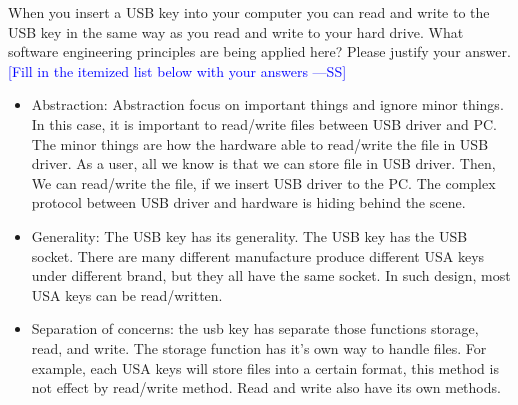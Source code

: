 \documentclass[12pt,fleqn]{examtst}
\newcommand{\authornote}[3]{\textcolor{#1}{[#3 ---#2]}}
\newcommand{\authornote}[3]{}
\newcommand{\wss}[1]{\authornote{blue}{SS}{#1}}
\begin{document}

\newpage

 When you insert a USB key into your computer you can read and
write to the USB key in the same way as you read and write to your hard drive.  What
software engineering principles are being applied here?  Please justify your
answer.\\

\noindent \wss{Fill in the itemized list below with your answers}

\begin{itemize}
\item Abstraction: Abstraction focus on important things and ignore minor things. In this case, it is important to read/write 
files between USB driver and PC. The minor things are how the hardware able to read/write the file in USB driver. As a user, 
all we know is that we can store file in USB driver. Then, We can read/write the file, if we insert USB driver to the PC. The 
complex protocol between USB driver and hardware is hiding behind the scene.
\item Generality: The USB key has its generality. The USB key has the USB socket. There are many different manufacture produce 
different USA keys under different brand, but they all have the same socket. In such design, most USA keys can be read/written.
\item Separation of concerns: the usb key has separate those functions storage, read, and write. The storage function has it's 
own way to handle files. For example, each USA keys will store files into a certain format, this method is not effect by 
read/write method. Read and write also have its own methods.
\end{itemize}


\newpage
\end{document}
